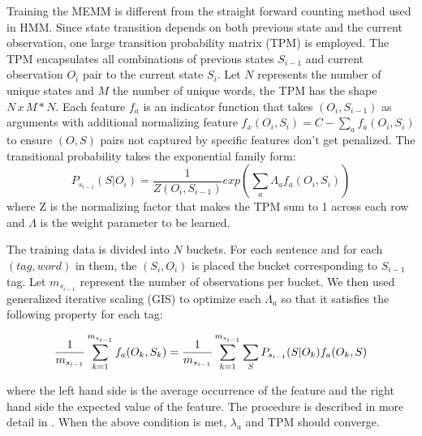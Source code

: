 Training the MEMM is different from the straight forward counting method used in HMM. Since state transition depends on both previous state and the current observation, one large transition probability matrix (TPM) is employed. The TPM encapsulates all combinations of previous states $S_{i-1}$ and current observation $O_i$ pair to the current state $S_i$. Let $N$ represents the number of unique states and $M$ the number of unique words, the TPM has the shape $N\,x\,M * N$. Each feature $f_a$ is an indicator function that takes $(O_i, S_{i-1})$ as arguments with additional normalizing feature $f_x(O_i, S_i) = C - \sum\limits_{a} f_a(O_i, S_i)$ to ensure $(O, S)$ pairs not captured by specific features don't get penalized. The transitional probability takes the exponential family form:
\vspace{-1em}
\begin{equation}
P_{s_{i-1}}(S | O_i) = \frac{1}{Z(O_i, S_{i-1})} exp(\sum\limits_{a}\Lambda_a f_a(O_i, S_i))
\end{equation}
where Z is the normalizing factor that makes the TPM sum to 1 across each row and $\Lambda$ is the weight parameter to be learned.

The training data is divided into $N$ buckets. For each sentence and for each $(tag, word)$ in them, the $(S_i, O_i)$ is placed the bucket corresponding to $S_{i-1}$ tag. Let $m_{s_{i-1}}$ represent the number of observations per bucket. We then used generalized iterative scaling (GIS) to optimize each $\Lambda_a$ so that it satisfies the following property for each tag:

\vspace{-1em}
\begin{equation}
\frac{1}{m_{s_{i-1}}}\sum\limits_{k=1}^{m_{s_{i-1}}} f_a(O_k, S_k) = \\ \frac{1}{m_{s_{i-1}}}\sum\limits_{k=1}^{m_{s_{i-1}}} \sum\limits_{S}P_{s_{i-1}}(S|O_k)f_a(O_k, S)
\end{equation}

where the left hand side is the average occurrence of the feature and the right hand side the expected value of the feature. The procedure is described in more detail in \cite{memmPaper}. When the above condition is met, $\lambda_a$ and TPM should converge.
